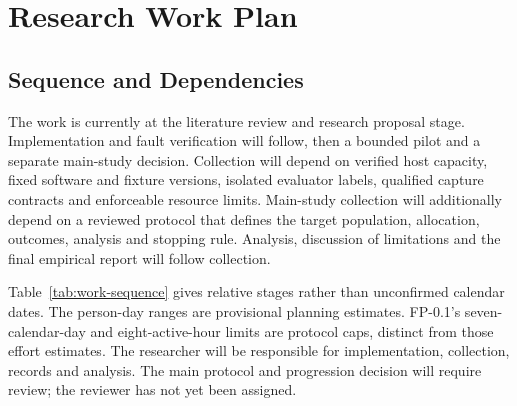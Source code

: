 \chapter{Research Work Plan}
\label{chap:work-plan}

\section{Sequence and Dependencies}

The work is currently at the literature review and research proposal stage. Implementation and fault verification will follow, then a bounded pilot and a separate main-study decision. Collection will depend on verified host capacity, fixed software and fixture versions, isolated evaluator labels, qualified capture contracts and enforceable resource limits. Main-study collection will additionally depend on a reviewed protocol that defines the target population, allocation, outcomes, analysis and stopping rule. Analysis, discussion of limitations and the final empirical report will follow collection.

Table~\ref{tab:work-sequence} gives relative stages rather than unconfirmed calendar dates. The person-day ranges are provisional planning estimates. FP-0.1's seven-calendar-day and eight-active-hour limits are protocol caps, distinct from those effort estimates. The researcher will be responsible for implementation, collection, records and analysis. The main protocol and progression decision will require review; the reviewer has not yet been assigned.

